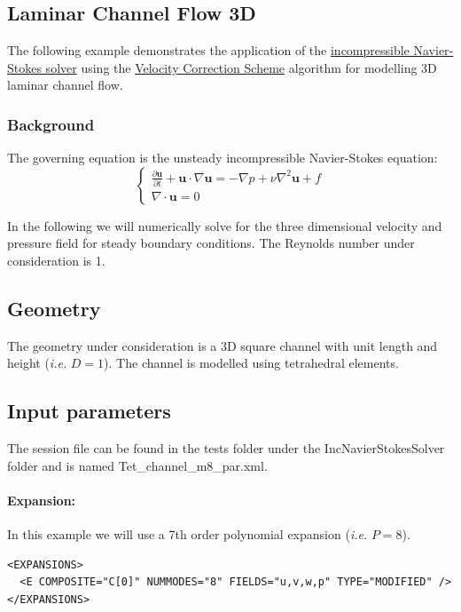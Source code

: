 \subsection{Laminar Channel Flow 3D}
The following example demonstrates the application of the \hyperref[IncNSsolver]{incompressible Navier-Stokes solver} using the \hyperref[VCSscheme]{Velocity Correction Scheme} algorithm for modelling 3D laminar channel flow.

\subsubsection{Background}
The governing equation is the unsteady incompressible Navier-Stokes equation:
\begin{equation}
\begin{cases}
\frac{\partial \textbf{u}}{\partial t} + \textbf{u} \cdot \nabla \textbf{u} = - \nabla p + \nu \nabla^2 \textbf{u} + f \\
\nabla \cdot \textbf{u} = 0
\end{cases}
\end{equation}

In the following we will numerically solve for the three dimensional velocity and pressure field for steady boundary conditions. The Reynolds number under consideration is 1.

\subsection{Geometry}
The geometry under consideration is a 3D square channel with unit length and height (\textit{i.e.} $D=1$). The channel is modelled using tetrahedral elements.

\subsection{Input parameters}
The session file can be found in the tests folder under the IncNavierStokesSolver folder and is named Tet\_channel\_m8\_par.xml.

\paragraph{Expansion:~} In this example we will use a 7th order polynomial expansion (\textit{i.e.} $P=8$).
\begin{lstlisting}[style=XMLStyle]
<EXPANSIONS>
  <E COMPOSITE="C[0]" NUMMODES="8" FIELDS="u,v,w,p" TYPE="MODIFIED" />
</EXPANSIONS>
\end{lstlisting}

